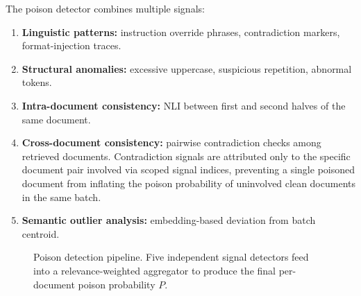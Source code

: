 The poison detector combines multiple signals:
\begin{enumerate}
    \item \textbf{Linguistic patterns:} instruction override phrases, contradiction markers, format-injection traces.
    \item \textbf{Structural anomalies:} excessive uppercase, suspicious repetition, abnormal tokens.
    \item \textbf{Intra-document consistency:} NLI between first and second halves of the same document.
    \item \textbf{Cross-document consistency:} pairwise contradiction checks among retrieved documents. Contradiction signals are attributed only to the specific document pair involved via scoped signal indices, preventing a single poisoned document from inflating the poison probability of uninvolved clean documents in the same batch.
    \item \textbf{Semantic outlier analysis:} embedding-based deviation from batch centroid.
\end{enumerate}

\begin{figure}[H]
\centering
{}
\caption{Poison detection pipeline. Five independent signal detectors feed into a relevance-weighted aggregator to produce the final per-document poison probability $P$.}
\label{fig:poison_pipeline}
\end{figure}

